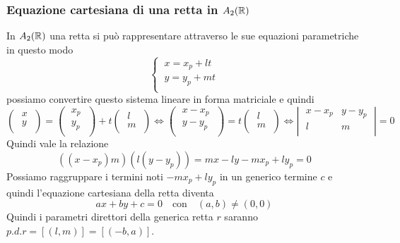 \subsubsection{Equazione cartesiana di una retta in \(A_2(\RR )\)}
In \(A_2(\RR )\) una retta si può rappresentare attraverso le sue equazioni parametriche in questo modo \[
\begin{cases}
    \ x = x_p + lt \\
    \ y = y_p + mt \\
\end{cases}
\] possiamo convertire questo sistema lineare in forma matriciale e quindi \[
\left( \;
\begin{matrix}
    x \\
    y \\
\end{matrix} \;
\right) = 
\left( \; \begin{matrix}
    x_p \\
    y_p \\
\end{matrix} \; \right) +
t  
\left( \; \begin{matrix}
    l \\
    m \\
\end{matrix} \; \right) \iff 
\left( \; \begin{matrix}
    x - x_p \\
    y - y_p \\
\end{matrix} \; \right) = t
\left( \; \begin{matrix}
    l \\
    m \\
\end{matrix} \; \right) \iff 
\left| \;
\begin{matrix}
    x - x_p & y - y_p \\
    l & m \\
\end{matrix} \;
\right| = 0
\] 
Quindi vale la relazione \[
    ((x-x_p) m) (l (y-y_p)) = mx - ly -mx_p + ly_p = 0
\] Possiamo raggruppare i termini noti \(-mx_p + ly_p\) in un generico termine \(c\) e quindi l'equazione cartesiana della retta diventa \[
ax + by + c = 0 \quad \text{con}\quad (a,b) \neq (0,0)
\] Quindi i parametri direttori della generica retta \(r\) saranno \(p.d.r = [(l,m)] = [(-b, a)]\).


